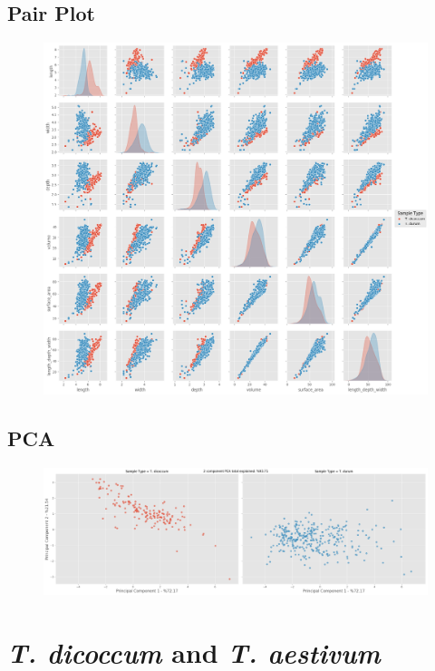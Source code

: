 \documentclass[11pt]{report}
\begin{document}
\subsection{Pair Plot}
\label{sec:org1cf84a1}

\begin{figure}[htbp]
\centering
\includegraphics[width=18cm]{./images/results/group5/pairplot.png}
\label{fig:org75ad873}
\end{figure}

\clearpage
\subsection{PCA}
\label{sec:org7b2de85}
\begin{figure}[htbp]
\centering
\includegraphics[width=18cm]{./images/results/group5/pca.png}
\label{fig:org7991465}
\end{figure}

\clearpage


\section{\emph{T. dicoccum} and \emph{T. aestivum}}
\label{sec:org084928e}
\end{document}

